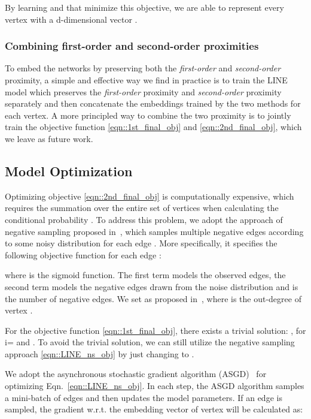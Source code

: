 \documentclass{sig-alternate-2013}
\begin{document}
By learning  and  that minimize this objective, we are able to represent every vertex   with a d-dimensional vector . 



\subsubsection{Combining first-order and second-order proximities}
To embed the networks by preserving both the \emph{first-order} and \emph{second-order} proximity, a simple and effective way we find in practice is to train the LINE model which preserves the \emph{first-order} proximity and \emph{second-order} proximity separately and then concatenate the embeddings trained by the two methods for each vertex.  A more principled way to combine the two proximity is to jointly train the objective function \eqref{eqn::1st_final_obj} and \eqref{eqn::2nd_final_obj}, which we leave as future work.

\subsection{Model Optimization}
\label{sec::model_optimization}
Optimizing objective \eqref{eqn::2nd_final_obj} is computationally expensive, which requires the summation over the entire set of vertices when calculating the conditional probability .  To address this problem, we adopt the approach of negative sampling proposed in~\cite{mikolov2013distributed}, which samples multiple negative edges according to some noisy distribution for each edge . More specifically, it specifies the following objective function for each edge :

where  is the sigmoid function. The first term models the observed edges, the second term models the negative edges drawn from the noise distribution and  is the number of negative edges. We set  as proposed in~\cite{mikolov2013distributed}, where  is the out-degree of vertex . 

For the objective function \eqref{eqn::1st_final_obj}, there exists a trivial solution: , for i= and . To avoid the trivial solution, we can still utilize the negative sampling approach \eqref{eqn::LINE_ns_obj} by just changing  to . 

We adopt the asynchronous stochastic gradient algorithm (ASGD)~\cite{recht2011hogwild} for optimizing Eqn.~\eqref{eqn::LINE_ns_obj}.  In each step, the ASGD algorithm samples a mini-batch of edges and then updates the model parameters. If an edge  is sampled, the gradient w.r.t. the embedding vector  of vertex  will be calculated as:
\end{document}
